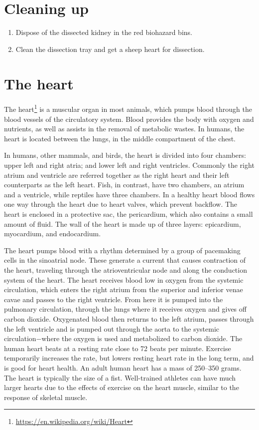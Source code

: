 \documentclass[]{book}
\providecommand{\tightlist}{%
  \setlength{\itemsep}{0pt}\setlength{\parskip}{0pt}}
\let\rmarkdownfootnote\footnote%
\def\footnote{\protect\rmarkdownfootnote}
\renewcommand{\href}[2]{#2\footnote{\url{#1}}}
\theoremstyle{definition}
\theoremstyle{definition}
\theoremstyle{definition}
\theoremstyle{remark}
\begin{document}
\section{Cleaning up}\label{cleaning-up-4}

\begin{enumerate}
\def\labelenumi{\arabic{enumi}.}
\tightlist
\item
  Dispose of the dissected kidney in the red biohazard bins.
\item
  Clean the dissection tray and get a sheep heart for dissection.
\end{enumerate}

\section{The heart}\label{the-heart}

The \href{https://en.wikipedia.org/wiki/Heart}{heart} is a muscular
organ in most animals, which pumps blood through the blood vessels of
the circulatory system. Blood provides the body with oxygen and
nutrients, as well as assists in the removal of metabolic wastes. In
humans, the heart is located between the lungs, in the middle
compartment of the chest.

In humans, other mammals, and birds, the heart is divided into four
chambers: upper left and right atria; and lower left and right
ventricles. Commonly the right atrium and ventricle are referred
together as the right heart and their left counterparts as the left
heart. Fish, in contrast, have two chambers, an atrium and a ventricle,
while reptiles have three chambers. In a healthy heart blood flows one
way through the heart due to heart valves, which prevent backflow. The
heart is enclosed in a protective sac, the pericardium, which also
contains a small amount of fluid. The wall of the heart is made up of
three layers: epicardium, myocardium, and endocardium.

The heart pumps blood with a rhythm determined by a group of pacemaking
cells in the sinoatrial node. These generate a current that causes
contraction of the heart, traveling through the atrioventricular node
and along the conduction system of the heart. The heart receives blood
low in oxygen from the systemic circulation, which enters the right
atrium from the superior and inferior venae cavae and passes to the
right ventricle. From here it is pumped into the pulmonary circulation,
through the lungs where it receives oxygen and gives off carbon dioxide.
Oxygenated blood then returns to the left atrium, passes through the
left ventricle and is pumped out through the aorta to the systemic
circulation−where the oxygen is used and metabolized to carbon dioxide.
The human heart beats at a resting rate close to 72 beats per minute.
Exercise temporarily increases the rate, but lowers resting heart rate
in the long term, and is good for heart health. An adult human heart has
a mass of 250--350 grams. The heart is typically the size of a fist.
Well-trained athletes can have much larger hearts due to the effects of
exercise on the heart muscle, similar to the response of skeletal
muscle.
\end{document}

